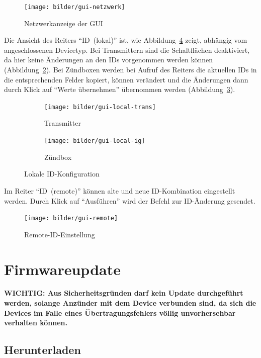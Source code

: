 \documentclass[paper=a4, parskip, numbers=noenddot, toc=listof, headsepline]{scrbook}
\begin{document}
			\begin{figure}[!t]
				\centering
				\texttt{[image: bilder/gui-netzwerk]}
				\caption{Netzwerkanzeige der GUI}
				\label{fig:gui-netzwerk}
			\end{figure}

			Die Ansicht des Reiters \enquote{ID~(lokal)} ist, wie Abbildung~\ref{fig:gui-local} zeigt, abhängig vom angeschlossenen Devicetyp. Bei Transmittern sind die Schaltflächen deaktiviert, da hier keine Änderungen an den IDs vorgenommen werden können (Abbildung~\ref{fig:gui-local-trans}). Bei Zündboxen werden bei Aufruf des Reiters die aktuellen IDs in die entsprechenden Felder kopiert, können verändert und die Änderungen dann durch Klick auf \enquote{Werte übernehmen} übernommen werden (Abbildung~\ref{fig:gui-local-ig}).

			\begin{figure}[!b]
				\centering
				\begin{subfigure}[t]{0.45\textwidth}
					\texttt{[image: bilder/gui-local-trans]}
					\caption{Transmitter}
					\label{fig:gui-local-trans}
				\end{subfigure}
				\begin{subfigure}[t]{0.45\textwidth}
					\texttt{[image: bilder/gui-local-ig]}
					\caption{Zündbox}
					\label{fig:gui-local-ig}
				\end{subfigure}
				\caption{Lokale ID-Konfiguration}
				\label{fig:gui-local}
			\end{figure}

			Im Reiter \enquote{ID~(remote)} können alte und neue ID-Kombination eingestellt werden. Durch Klick auf \enquote{Ausführen} wird der Befehl zur ID-Änderung gesendet.

			\begin{figure}[!t]
				\centering
				\texttt{[image: bilder/gui-remote]}
				\caption{Remote-ID-Einstellung}
				\label{fig:gui-remote}
			\end{figure}

		\section{Firmwareupdate}
			\label{ch:firmwareupdate}

			\textbf{WICHTIG: Aus Sicherheitsgründen darf kein Update durchgeführt werden, solange Anzünder mit dem Device verbunden sind, da sich die Devices im Falle eines Übertragungsfehlers völlig unvorhersehbar verhalten können.}

			\subsection{Herunterladen}
\end{document}
